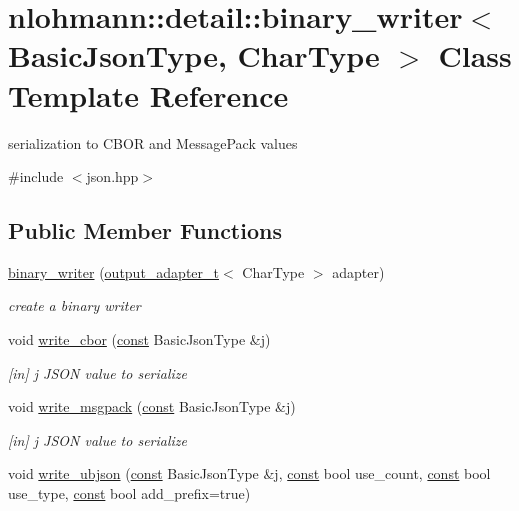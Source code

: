 \hypertarget{classnlohmann_1_1detail_1_1binary__writer}{}\section{nlohmann\+:\+:detail\+:\+:binary\+\_\+writer$<$ Basic\+Json\+Type, Char\+Type $>$ Class Template Reference}
\label{classnlohmann_1_1detail_1_1binary__writer}


serialization to C\+B\+OR and Message\+Pack values  




{\ttfamily \#include $<$json.\+hpp$>$}

\subsection*{Public Member Functions}
\begin{DoxyCompactItemize}
\item 
\hyperlink{classnlohmann_1_1detail_1_1binary__writer_a373289af95a946c19bb4a58a5df71a78}{binary\+\_\+writer} (\hyperlink{namespacenlohmann_1_1detail_a0fd8edff7729aa2dd92b070964bade2e}{output\+\_\+adapter\+\_\+t}$<$ Char\+Type $>$ adapter)
\begin{DoxyCompactList}\small\item\em create a binary writer \end{DoxyCompactList}\item 
void \hyperlink{classnlohmann_1_1detail_1_1binary__writer_aa0ab8d27fd88a33a2f801413ac4c7fbc}{write\+\_\+cbor} (\hyperlink{functions__c_8js_afacfd9c985d225bb07483b887a801b6f}{const} Basic\+Json\+Type \&j)
\begin{DoxyCompactList}\small\item\em \mbox{[}in\mbox{]} j J\+S\+ON value to serialize \end{DoxyCompactList}\item 
void \hyperlink{classnlohmann_1_1detail_1_1binary__writer_ae4e0852b64102ce4b07d99f08f828b7c}{write\+\_\+msgpack} (\hyperlink{functions__c_8js_afacfd9c985d225bb07483b887a801b6f}{const} Basic\+Json\+Type \&j)
\begin{DoxyCompactList}\small\item\em \mbox{[}in\mbox{]} j J\+S\+ON value to serialize \end{DoxyCompactList}\item 
void \hyperlink{classnlohmann_1_1detail_1_1binary__writer_a0f6c65053d859269f88eb4ebb0cd7060}{write\+\_\+ubjson} (\hyperlink{functions__c_8js_afacfd9c985d225bb07483b887a801b6f}{const} Basic\+Json\+Type \&j, \hyperlink{functions__c_8js_afacfd9c985d225bb07483b887a801b6f}{const} bool use\+\_\+count, \hyperlink{functions__c_8js_afacfd9c985d225bb07483b887a801b6f}{const} bool use\+\_\+type, \hyperlink{functions__c_8js_afacfd9c985d225bb07483b887a801b6f}{const} bool add\+\_\+prefix=true)
\end{DoxyCompactItemize}


